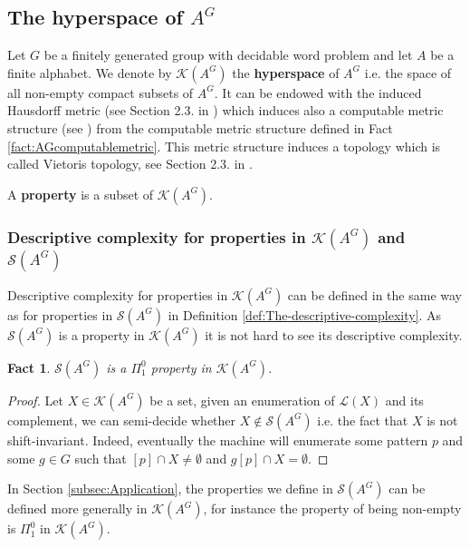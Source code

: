 \documentclass[french,american]{article}
\theoremstyle{plain}
\theoremstyle{definition}
\theoremstyle{remark}
\theoremstyle{plain}
\newtheorem{fact}[theorem]{Fact}
\begin{document}
\subsection[The hyperspace of A\^{}G]{The hyperspace of $A^{G}$}\label{subsec:The-hyperspace-of}

Let $G$ be a finitely generated group with decidable word problem
and let $A$ be a finite alphabet. We denote by $\mathcal{K}(A^{G})$
the \textbf{hyperspace} of $A^{G}$ i.e. the space of all non-empty
compact subsets of $A^{G}$. It can be endowed with the induced Hausdorff
metric (see Section 2.3. in \cite{Phdamir2024}) which induces also
a computable metric structure (see \cite{Iljazović2021}) from the
computable metric structure defined in Fact \ref{fact:AGcomputablemetric}.
This metric structure induces a topology which is called Vietoris
topology, see Section 2.3. in \cite{Phdamir2024}.

A \textbf{property }is a subset of $\mathcal{K}(A^{G})$.

\subsubsection{Descriptive complexity for properties in $\mathcal{K}(A^{G})$ and
$\mathcal{S}(A^{G})$}\label{subsec:Descriptive-complexity-for}

Descriptive complexity for properties in $\mathcal{K}(A^{G})$ can
be defined in the same way as for properties in $\mathcal{S}(A^{G})$
in Definition \ref{def:The-descriptive-complexity}. As $\mathcal{S}(A^{G})$
is a property in $\mathcal{K}(A^{G})$ it is not hard to see its descriptive
complexity.
\begin{fact}
\label{fact:Sp01}$\mathcal{S}(A^{G})$ is a $\Pi_{1}^{0}$
property in $\mathcal{K}(A^{G})$. 
\end{fact}

\begin{proof}
Let $X\in\mathcal{K}(A^{G})$ be a set, given an enumeration of $\mathcal{L}(X)$
and its complement, we can semi-decide whether $X\notin\mathcal{S}(A^{G})$
i.e. the fact that $X$ is not shift-invariant. Indeed, eventually
the machine will enumerate some pattern $p$ and some $g\in G$ such
that $[p]\cap X\neq\emptyset$ and $g[p]\cap X=\emptyset$.
\end{proof}
In Section \ref{subsec:Application}, the properties we define in
$\mathcal{S}(A^{G})$ can be defined more generally in $\mathcal{K}(A^{G})$,
for instance the property of being non-empty is $\Pi_{1}^{0}$ in
$\mathcal{K}(A^{G})$.
\end{document}
